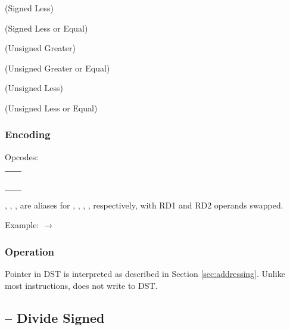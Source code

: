 \documentclass[a4paper,12pt,twoside,extrafontsizes]{memoir}
\begin{document}
{ (Signed Less)

 (Signed Less or Equal)

 (Unsigned Greater)

 (Unsigned Greater or Equal)

 (Unsigned Less)

 (Unsigned Less or Equal)

\subsubsection{Encoding}


Opcodes:

\begin{tabularx}{\textwidth}{lL}
   &  \\
  &  \\
  &  \\
 &  \\
  &  \\
 &  \\
\end{tabularx}

, , ,  are aliases for , , , , respectively, with RD1 and RD2 operands swapped.

Example:  $\rightarrow$ 

\subsubsection{Operation}


Pointer in DST is interpreted as described in Section \ref{sec:addressing}. Unlike most instructions,  does not write to DST.

\subsection{ -- Divide Signed}
\label{subsec:instr:divs}

}
\end{document}
